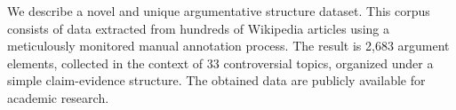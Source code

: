 We describe a novel and unique argumentative structure dataset. This corpus consists of data extracted from hundreds of Wikipedia articles using a meticulously monitored manual annotation process. The result is 2,683 argument elements, collected in the context of 33 controversial topics, organized under a simple claim-evidence structure. The obtained data are publicly available for academic research.
